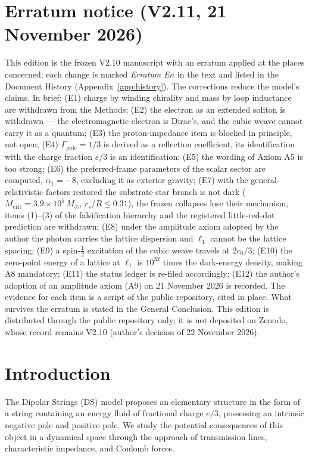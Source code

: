 \documentclass[11pt,a4paper]{article}
\theoremstyle{plain}
\theoremstyle{remark}
\begin{document}
\section*{Erratum notice (V2.11, 21 November 2026)}
This edition is the frozen V2.10 manuscript with an erratum applied at the places concerned; each change is marked \emph{Erratum E$n$} in the text and listed in the Document History (Appendix~\ref{app:history}). The corrections reduce the model's claims. In brief: (E1) charge by winding chirality and mass by loop inductance are withdrawn from the Methods; (E2) the electron as an extended soliton is withdrawn --- the electromagnetic electron is Dirac's, and the cubic weave cannot carry it as a quantum; (E3) the proton-impedance item is blocked in principle, not open; (E4) $\Gamma_{\text{pole}} = 1/3$ is derived as a reflection coefficient, its identification with the charge fraction $e/3$ is an identification; (E5) the wording of Axiom A5 is too strong; (E6) the preferred-frame parameters of the scalar sector are computed, $\alpha_1 = -8$, excluding it as exterior gravity; (E7) with the general-relativistic factors restored the substrate-star branch is not dark ($M_{\text{crit}} = 3.9\times10^{5}\,M_\odot$, $r_s/R \le 0.31$), the frozen collapses lose their mechanism, items (1)--(3) of the falsification hierarchy and the registered little-red-dot prediction are withdrawn; (E8) under the amplitude axiom adopted by the author the photon carries the lattice dispersion and $\ell_1$ cannot be the lattice spacing; (E9) a spin-$\tfrac12$ excitation of the cubic weave travels at $2c_0/3$; (E10) the zero-point energy of a lattice at $\ell_1$ is $10^{32}$ times the dark-energy density, making A8 mandatory; (E11) the status ledger is re-filed accordingly; (E12) the author's adoption of an amplitude axiom (A9) on 21 November 2026 is recorded. The evidence for each item is a script of the public repository, cited in place. What survives the erratum is stated in the General Conclusion. This edition is distributed through the public repository only; it is not deposited on Zenodo, whose record remains V2.10 (author's decision of 22 November 2026).

\tableofcontents
\newpage

\section{Introduction}
The Dipolar Strings (DS) model proposes an elementary structure in the form of a string containing an energy fluid of fractional charge $e/3$, possessing an intrinsic negative pole and positive pole. We study the potential consequences of this object in a dynamical space through the approach of transmission lines, characteristic impedance, and Coulomb forces.
\end{document}
